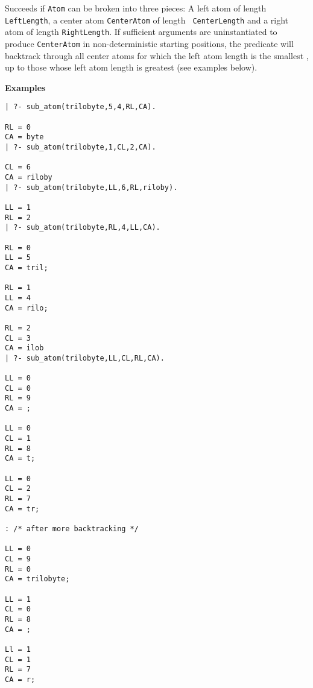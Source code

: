 \begin{description}
%
Succeeds if {\tt Atom} can be broken into three pieces: A left atom of
length {\tt LeftLength}, a center atom {\tt CenterAtom} of length {\tt
  CenterLength} and a right atom of length {\tt RightLength}.  If
sufficient arguments are uninstantiated to produce {\tt CenterAtom} in
non-deterministic starting positions, the predicate will backtrack
through all center atoms for which the left atom length is the
smallest , up to those whose left atom length is greatest (see
examples below).

{\bf Examples}
{\small
\begin{verbatim}
| ?- sub_atom(trilobyte,5,4,RL,CA).

RL = 0
CA = byte
| ?- sub_atom(trilobyte,1,CL,2,CA).

CL = 6
CA = riloby
| ?- sub_atom(trilobyte,LL,6,RL,riloby).

LL = 1
RL = 2
| ?- sub_atom(trilobyte,RL,4,LL,CA).

RL = 0
LL = 5
CA = tril;

RL = 1
LL = 4
CA = rilo;

RL = 2
CL = 3
CA = ilob
| ?- sub_atom(trilobyte,LL,CL,RL,CA).

LL = 0
CL = 0
RL = 9
CA = ;

LL = 0
CL = 1
RL = 8
CA = t;

LL = 0
CL = 2
RL = 7
CA = tr;

: /* after more backtracking */

LL = 0
CL = 9
RL = 0
CA = trilobyte;

LL = 1
CL = 0
RL = 8
CA = ;

Ll = 1
CL = 1
RL = 7
CA = r;
\end{verbatim}
}


\end{description}
